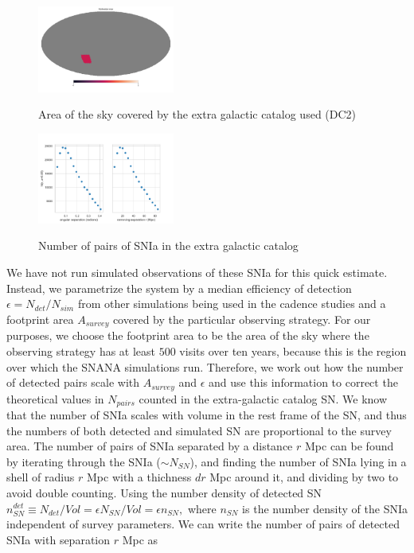 \begin{figure}
    \begin{center}
        {\includegraphics[width=0.4\textwidth]{figures/catalog_area}}
        \caption{Area of the sky covered by the extra galactic catalog used (DC2)}
        \label{fig:catalog_area}
    \end{center}
\end{figure}


\begin{figure}
    \begin{center}
        {\includegraphics[width=0.4\textwidth]{figures/NumberPairsatDistance_z0p05}}
        \caption{Number of pairs of SNIa in the extra galactic catalog }
         \label{fig:num_pairs_cat}
    \end{center}
\end{figure}
We have not run simulated observations of these SNIa for this quick estimate. Instead, we parametrize the system by a median efficiency of detection $\epsilon = N_{det} / N_{sim} $ from other simulations being used in the cadence studies and a footprint area $A_{survey}$ covered by the particular observing strategy. For our purposes, we choose the footprint area to be the area of the sky where the observing strategy has at least $500$ visits over ten years, because this is the region over which the SNANA simulations run.
Therefore, we work out how the number of detected pairs scale with $A_{survey}$ and $\epsilon$ and use this information to correct the theoretical values in $N_{pairs}$ counted in the extra-galactic catalog SN. We know that the number of SNIa scales with volume in the rest frame of the SN, and thus the numbers of both detected and simulated SN are proportional to the survey area. The number of pairs of SNIa separated by a distance $r$ Mpc can be found by iterating through the SNIa ($\sim N_{SN}$), and finding the number of SNIa lying in a shell of radius $r$ Mpc with a thichness $dr$ Mpc around it, and dividing by two to avoid double counting. Using the number density of detected SN $n^{det}_{SN} \equiv N_{det}/Vol = \epsilon N_{SN}/Vol = \epsilon n_{SN},$ where $n_{SN}$ is the number density of the SNIa independent of survey parameters. We can write the number of pairs of detected SNIa with separation $r$ Mpc as 
